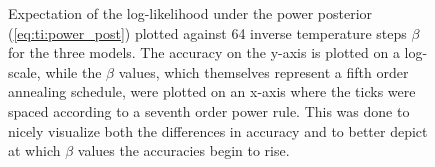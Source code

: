 \documentclass[\relativeRoot/main.tex]{subfiles}
\begin{document}
\begin{figure}
    \centering
    
    \caption[Plotted accuracy over the course of a thermodynamic integration round]{
        Expectation of the log-likelihood under the power posterior (\cref{eq:ti:power_post}) plotted against 64 inverse temperature steps $\beta$ for the three models. The accuracy on the y-axis is plotted on a log-scale, while the $\beta$ values, which themselves represent a fifth order annealing schedule, were plotted on an x-axis where the ticks were spaced according to a seventh order power rule. This was done to nicely visualize both the differences in accuracy and to better depict at which $\beta$ values the accuracies begin to rise.
    }
    \label{fig:bilateral:model_comp:thermo_int}
\end{figure}
\end{document}
